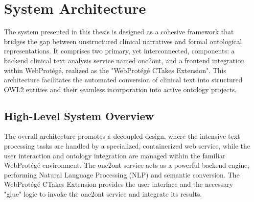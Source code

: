 \documentclass[12pt, a4paper]{article}
\begin{document}
\section{System Architecture}

The system presented in this thesis is designed as a cohesive framework that bridges the gap between unstructured clinical narratives and formal ontological representations. It comprises two primary, yet interconnected, components: a backend clinical text analysis service named onc2ont, and a frontend integration within WebProtégé, realized as the "WebProtégé CTakes Extension". This architecture facilitates the automated conversion of clinical text into structured OWL2 entities and their seamless incorporation into active ontology projects.

\subsection{High-Level System Overview}
The overall architecture promotes a decoupled design, where the intensive text processing tasks are handled by a specialized, containerized web service, while the user interaction and ontology integration are managed within the familiar WebProtégé environment. The onc2ont service acts as a powerful backend engine, performing Natural Language Processing (NLP) and semantic conversion. The WebProtégé CTakes Extension provides the user interface and the necessary "glue" logic to invoke the onc2ont service and integrate its results.
\end{document}
